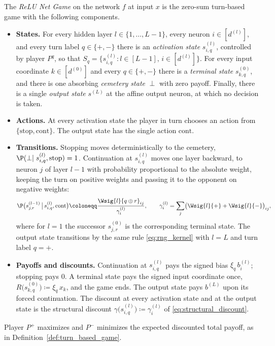 \begin{definition}\label{def:relu_net_game}
The \emph{ReLU Net Game} on the network $f$ at input $x$ is the zero-sum turn-based game with the following components.
\begin{itemize}
	\item \textbf{States.} For every hidden layer $l \in \{1, \ldots, L-1\}$, every neuron $i \in [d^{(l)}]$, and every turn label $q \in \{+,-\}$ there is an \emph{activation state} $s^{(l)}_{i,q}$, controlled by player $P^{q}$, so that $S_q = \bigl\{ s^{(l)}_{i,q} : l \in [L-1],\, i \in [d^{(l)}] \bigr\}$. For every input coordinate $k \in [d^{(0)}]$ and every $q \in \{+,-\}$ there is a \emph{terminal state} $s^{(0)}_{k,q}$, and there is one absorbing \emph{cemetery state} $\perp$ with zero payoff. Finally, there is a single \emph{output state} $s^{(L)}$ at the affine output neuron, at which no decision is taken.
	\item \textbf{Actions.} At every activation state the player in turn chooses an action from $\{\mathrm{stop}, \mathrm{cont}\}$. The output state has the single action $\mathrm{cont}$.
	\item \textbf{Transitions.} Stopping moves deterministically to the cemetery, $\P(\perp \mid s^{(l)}_{i,q}, \mathrm{stop}) = 1$. Continuation at $s^{(l)}_{i,q}$ moves one layer backward, to neuron $j$ of layer $l-1$ with probability proportional to the absolute weight, keeping the turn on positive weights and passing it to the opponent on negative weights:
	\begin{equation}
		\P\bigl( s^{(l-1)}_{j,r} \,\big|\, s^{(l)}_{i,q}, \mathrm{cont} \bigr)
		\coloneqq \frac{\Wsig{l}{q \oplus r}_{ij}}{\gamma^{(l)}_i},
		\qquad
		\gamma^{(l)}_i = \sum_{j} \bigl( \Wsig{l}{+} + \Wsig{l}{-} \bigr)_{ij},
		\label{eq:rng_kernel}
	\end{equation}
	where for $l = 1$ the successor $s^{(0)}_{j,r}$ is the corresponding terminal state. The output state transitions by the same rule \eqref{eq:rng_kernel} with $l = L$ and turn label $q = +$.
	\item \textbf{Payoffs and discounts.} Continuation at $s^{(l)}_{i,q}$ pays the signed bias $\xi_{q}\, b^{(l)}_i$; stopping pays $0$. A terminal state pays the signed input coordinate once, $R\bigl(s^{(0)}_{k,q}\bigr) \coloneqq \xi_{q}\, x_k$, and the game ends. The output state pays $b^{(L)}$ upon its forced continuation. The discount at every activation state and at the output state is the structural discount $\gamma\bigl(s^{(l)}_{i,q}\bigr) \coloneqq \gamma^{(l)}_i$ of \eqref{eq:structural_discount}.
\end{itemize}
Player $P^{+}$ maximizes and $P^{-}$ minimizes the expected discounted total payoff, as in Definition~\ref{def:turn_based_game}.
\end{definition}

